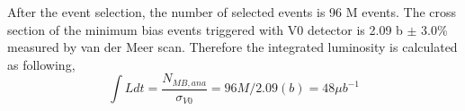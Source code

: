 After the event selection, the number of selected events is 96 M events. 
The cross section of the minimum bias events triggered with V0 detector is 2.09 b $\pm$ 3.0\%  measured by van der Meer scan\cite{bib_v0cross}. 
Therefore the integrated luminosity is calculated as following, 
\begin{equation}
  \int{Ldt} = \frac{N_{MB,ana}}{\sigma_{V0}} = 96 M / 2.09 (b) = 48 \mu b^{-1}
\end{equation}





